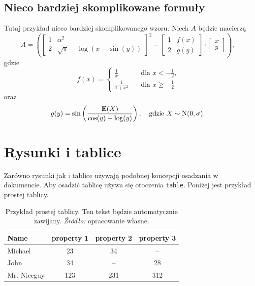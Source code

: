 \documentclass[polish, twoside, 12pt, a4paper]{article}
\theoremstyle{definition}
\theoremstyle{plain}
\theoremstyle{remark}
\begin{document}
\subsection{Nieco bardziej skomplikowane formuły}

Tutaj przykład nieco bardziej skomplikowanego wzoru. Niech \( A  \) będzie macierzą
\[
A =
\left(
\begin{bmatrix}
1                   & \alpha^2       \\
2                   & \sqrt{\pi} - \log(x-\sin(y))
\end{bmatrix}^{2}
- 
\begin{bmatrix}
1                   & f(x)           \\
2                   & g(y)
\end{bmatrix}
\cdot
\begin{bmatrix}
x                                    \\
y
\end{bmatrix}
\right),
\]
gdzie
\[
f(x) = 
\left\{
  \begin{aligned}
    \frac{1}{x}     & \quad \text{dla \(x<-\frac{1}{2}\),} \\
    \frac{1}{1+x^2} & \quad \text{dla \(x \geq -\frac{1}{2}\)}
  \end{aligned}
\right.
\]
oraz
\[
g(y) = \sin\left(\frac{\mathrm{\mathbf{E}}(X)}{\cos(y) + \log(y)}\right), 
\quad\text{gdzie \( X \sim \mathrm{N}(0, \sigma)  \).}
\]

\clearpage
\section{Rysunki i tablice}

Zarówno rysunki jak i tablice używają podobnej koncepcji osadzania w dokumencie. Aby osadzić tablicę używa się otoczenia  \verb+table+. Poniżej jest przykład prostej tablicy.

\begin{table}[hbt]
  \centering

  \captionsetup{margin=10pt,font=small,labelfont=bf,width=.8\textwidth}

  \caption[Przykład prostej tablicy]{Przykład prostej tablicy. Ten tekst będzie automatycznie zawijany. \textit{Źródło:} opracowanie własne.}
  \label{tab:exceptional-table}

\vspace*{2ex}

  \begin{tabular}{lccc}
    Name        & property 1 & property 2 & property 3 \\ \hline
    Michael     & 23         & 34         & --         \\
    John        & 34         & --         & 28         \\
    Mr. Niceguy & 123        & 231        & 312        \\ \hline
  \end{tabular}
\end{table}
\end{document}
